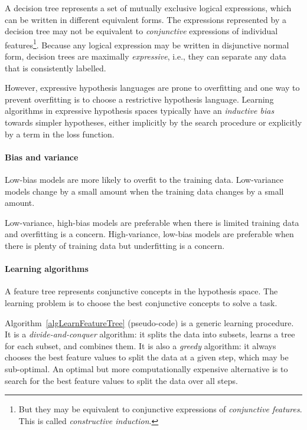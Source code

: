 A decision tree represents a set of mutually exclusive logical expressions,
which can be written in different equivalent forms.
The expressions represented by a decision tree may not be equivalent to
\textit{conjunctive} expressions of individual features\footnote{But they may
  be equivalent to conjunctive expressions of \textit{conjunctive features}.
  This is called \textit{constructive induction}.
}.
Because any logical expression may be written in disjunctive normal form,
decision trees are maximally \textit{expressive}, i.e., they can separate any
data that is consistently labelled.

However, expressive hypothesis languages are prone to overfitting and one way
to prevent overfitting is to choose a restrictive hypothesis language.
Learning algorithms in expressive hypothesis spaces typically have an
\textit{inductive bias} towards simpler hypotheses, either implicitly by the
search procedure or explicitly by a term in the loss function.

\paragraph{Bias and variance}

Low-bias models are more likely to overfit to the training data.
Low-variance models change by a small amount when the training data changes by
a small amount.

Low-variance, high-bias models are preferable when there is limited training
data and overfitting is a concern.
High-variance, low-bias models are preferable when there is plenty of training
data but underfitting is a concern.

\paragraph{Learning algorithms}

A feature tree represents conjunctive concepts in the hypothesis space.
The learning problem is to choose the best conjunctive concepts to solve a
task.

Algorithm~\ref{algLearnFeatureTree} (pseudo-code) is a generic learning
procedure.
It is a \textit{divide-and-conquer} algorithm: it splits the data into subsets,
learns a tree for each subset, and combines them.
It is also a \textit{greedy} algorithm: it always chooses the best feature
values to split the data at a given step, which may be sub-optimal.
An optimal but more computationally expensive alternative is to search for the
best feature values to split the data over all steps.

